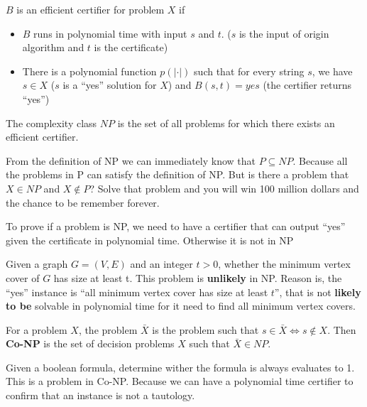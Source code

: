 			\begin{definition}
				$B$ is an efficient certifier for problem $X$ if
				\begin{itemize}
					\item $B$ runs in polynomial time with input $s$ and $t$. ($s$ is the input of origin algorithm and $t$ is the certificate)
					\item There is a polynomial function $p(|\cdot|)$ such that for every string $s$, we have $s \in X$ ($s$ is a ``yes'' solution for $X$) and $B(s, t) = yes$ (the certifier returns ``yes'')
				\end{itemize}
			\end{definition}

			\begin{definition}[NP]
				The complexity class $NP$ is the set of all problems for which there exists an efficient certifier.
			\end{definition}

			From the definition of NP we can immediately know that $P \subseteq NP$. Because all the problems in P can satisfy the definition of NP. But is there a problem that $X \in NP$ and $X \notin P$? Solve that problem and you will win 100 million dollars and the chance to be remember forever.


			To prove if a problem is NP, we need to have a certifier that can output ``yes'' given the certificate in polynomial time. Otherwise it is not in NP

			\begin{example}
				Given a graph $G = (V, E)$ and an integer $t > 0$, whether the minimum vertex cover of $G$ has size at least t. This problem is \textbf{unlikely} in NP. Reason is, the ``yes'' instance is ``all minimum vertex cover has size at least $t$'', that is not \textbf{likely to be} solvable in polynomial time for it need to find all minimum vertex covers.
			\end{example}

			\begin{definition}[Co-NP]
				For a problem $X$, the problem $\bar{X}$ is the problem such that $s \in \bar{X} \iff s \notin X$. Then \textbf{Co-NP} is the set of decision problems $X$ such that $\bar{X} \in NP$.
			\end{definition}

			\begin{example}
				Given a boolean formula, determine wither the formula is always evaluates to 1. This is a problem in Co-NP. Because we can have a polynomial time certifier to confirm that an instance is not a tautology.
			\end{example}

